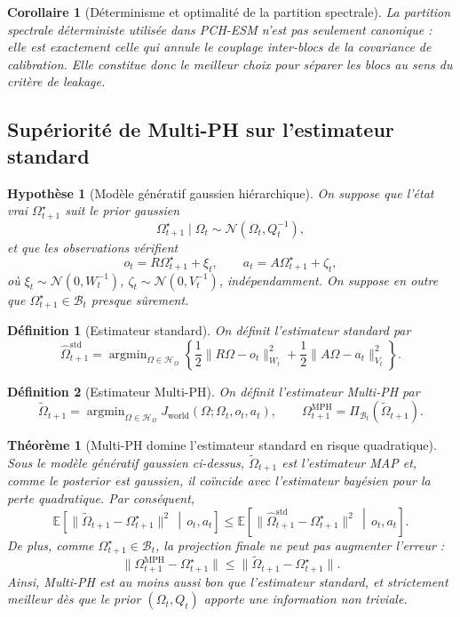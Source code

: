\documentclass[11pt,a4paper]{article}
\newtheorem{definition}{Définition}[section]
\newtheorem{assumption}{Hypothèse}[section]
\newtheorem{theorem}{Théorème}[section]
\newtheorem{corollary}{Corollaire}[section]
\DeclareMathOperator{\argmin}{argmin}
\newcommand{\Hh}{\mathcal H}
\newcommand{\1}{\mathbf 1}
\begin{document}
\begin{corollary}[Déterminisme et optimalité de la partition spectrale]
La partition spectrale déterministe utilisée dans PCH-ESM n'est pas seulement canonique :
elle est exactement celle qui annule le couplage inter-blocs de la covariance de calibration.
Elle constitue donc le meilleur choix pour séparer les blocs au sens du critère de leakage.
\end{corollary}

\subsection{Supériorité de Multi-PH sur l'estimateur standard}

\begin{assumption}[Modèle génératif gaussien hiérarchique]
On suppose que l'état vrai \(\Omega_{t+1}^\star\) suit le prior gaussien
\[
\Omega_{t+1}^\star \mid \Omega_t \sim \mathcal N(\Omega_t,Q_t^{-1}),
\]
et que les observations vérifient
\[
o_t = R\Omega_{t+1}^\star + \xi_t,
\qquad
a_t = A\Omega_{t+1}^\star + \zeta_t,
\]
où \(\xi_t\sim\mathcal N(0,W_t^{-1})\), \(\zeta_t\sim\mathcal N(0,V_t^{-1})\), indépendamment.
On suppose en outre que \(\Omega_{t+1}^\star\in\mathcal B_t\) presque sûrement.
\end{assumption}

\begin{definition}[Estimateur standard]
On définit l'estimateur standard par
\[
\hat\Omega_{t+1}^{\mathrm{std}}
=
\argmin_{\Omega\in\Hh_\Omega}
\left\{
\frac12\|R\Omega-o_t\|_{W_t}^2
+
\frac12\|A\Omega-a_t\|_{V_t}^2
\right\}.
\]
\end{definition}

\begin{definition}[Estimateur Multi-PH]
On définit l'estimateur Multi-PH par
\[
\tilde\Omega_{t+1}
=
\argmin_{\Omega\in\Hh_\Omega}
J_{\mathrm{world}}(\Omega;\Omega_t,o_t,a_t),
\qquad
\Omega_{t+1}^{\mathrm{MPH}}
=
\Pi_{\mathcal B_t}(\tilde\Omega_{t+1}).
\]
\end{definition}

\begin{theorem}[Multi-PH domine l'estimateur standard en risque quadratique]
Sous le modèle génératif gaussien ci-dessus, \(\tilde\Omega_{t+1}\) est l'estimateur MAP et, comme le posterior est gaussien, il coïncide avec l'estimateur bayésien pour la perte quadratique.
Par conséquent,
\[
\mathbb E\!\left[\|\tilde\Omega_{t+1}-\Omega_{t+1}^\star\|^2 \,\middle|\, o_t,a_t\right]
\le
\mathbb E\!\left[\|\hat\Omega_{t+1}^{\mathrm{std}}-\Omega_{t+1}^\star\|^2 \,\middle|\, o_t,a_t\right].
\]
De plus, comme \(\Omega_{t+1}^\star\in\mathcal B_t\), la projection finale ne peut pas augmenter l'erreur :
\[
\|\Omega_{t+1}^{\mathrm{MPH}}-\Omega_{t+1}^\star\|
\le
\|\tilde\Omega_{t+1}-\Omega_{t+1}^\star\|.
\]
Ainsi, Multi-PH est au moins aussi bon que l'estimateur standard, et strictement meilleur dès que le prior \((\Omega_t,Q_t)\) apporte une information non triviale.
\end{theorem}
\end{document}
